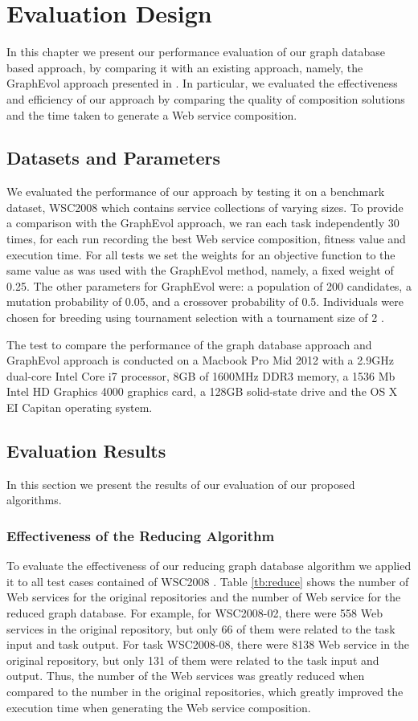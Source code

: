 \chapter{Evaluation Design}\label{C:ed}
In this chapter we present our performance evaluation of our graph database based approach, by comparing it with an existing approach, namely, the GraphEvol approach presented in \cite{2}. In particular, we evaluated the effectiveness and efficiency of our approach by comparing the quality of composition solutions and the time taken to generate a Web service composition. 

\section{Datasets and Parameters} 
We evaluated the performance of our approach by testing it on a benchmark dataset, WSC2008 \cite{12} which contains service collections of varying sizes. To provide a comparison with the GraphEvol approach, we ran each task independently 30 times, for each run recording the best Web service composition, fitness value and execution time. For all tests we set the weights for an objective function to the same value as was used with the GraphEvol method, namely, a fixed weight of 0.25. The other parameters for GraphEvol were: a population of 200 candidates, a mutation probability of 0.05, and a crossover probability of 0.5. Individuals were chosen for breeding using tournament selection with a tournament size of 2 \cite{2}.\par

The test to compare the performance of the graph database approach and GraphEvol approach is conducted on a Macbook Pro Mid 2012 with a 2.9GHz dual-core Intel Core i7 processor, 8GB of 1600MHz DDR3 memory, a 1536 Mb Intel HD Graphics 4000 graphics card, a 128GB solid-state drive and the OS X EI Capitan operating system.

\section{Evaluation Results} 
In this section we present the results of our evaluation of our proposed algorithms. 

\subsection{Effectiveness of the Reducing Algorithm} 
To evaluate the effectiveness of our reducing graph database algorithm we applied it to all test cases contained of WSC2008 \cite{12}.  Table \ref{tb:reduce} shows the number of Web services for the original repositories and the number of Web service for the reduced graph database. For example, for WSC2008-02, there were 558 Web services in the original repository, but only 66 of them were related to the task input and task output. For task WSC2008-08, there were 8138 Web service in the original repository, but only 131 of them were related to the task input and output. Thus, the number of the Web services was greatly reduced when compared to the number in the original repositories, which greatly improved the execution time when generating the Web service composition.

